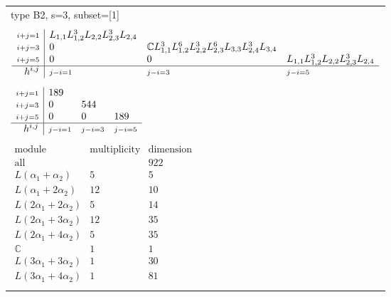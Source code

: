 \documentclass[crop,border=2mm]{standalone}
\begin{document}
\begin{tabular}{l}
{\huge type B2, s=3, subset=[1]}\\ \\


$\displaystyle
\begin{array}{r|l l l}
	{\scriptstyle i+j=1}&L_{1,1}L_{1,2}^{3}L_{2,2}L_{2,3}^{3}L_{2,4}&&\\
	{\scriptstyle i+j=3}&0&\mathbb{C}L_{1,1}^{3}L_{1,2}^{6}L_{2,2}^{3}L_{2,3}^{6}L_{3,3}L_{2,4}^{3}L_{3,4}&\\
	{\scriptstyle i+j=5}&0&0&L_{1,1}L_{1,2}^{3}L_{2,2}L_{2,3}^{3}L_{2,4}\\
	\hline h^{i,j}&{\scriptstyle j-i=1}&{\scriptstyle j-i=3}&{\scriptstyle j-i=5}
\end{array}
$ \\ \\


$\displaystyle
\begin{array}{r|l l l}
	{\scriptstyle i+j=1}&189&&\\
	{\scriptstyle i+j=3}&0&544&\\
	{\scriptstyle i+j=5}&0&0&189\\
	\hline h^{i,j}&{\scriptstyle j-i=1}&{\scriptstyle j-i=3}&{\scriptstyle j-i=5}
\end{array}
$ \\ \\


$\displaystyle
\begin{array}{rll}
	\text{module}&\text{multiplicity}&\text{dimension} \\ \hline \text{all}&&922 \\
	L\left(\alpha_{1}+\alpha_{2}\right)&5&5\\
	L\left(\alpha_{1}+ 2\alpha_{2}\right)&12&10\\
	L\left( 2\alpha_{1}+ 2\alpha_{2}\right)&5&14\\
	L\left( 2\alpha_{1}+ 3\alpha_{2}\right)&12&35\\
	L\left( 2\alpha_{1}+ 4\alpha_{2}\right)&5&35\\
	\mathbb{C}&1&1\\
	L\left( 3\alpha_{1}+ 3\alpha_{2}\right)&1&30\\
	L\left( 3\alpha_{1}+ 4\alpha_{2}\right)&1&81
\end{array}
$ \\ \\

\end{tabular}
\end{document}
